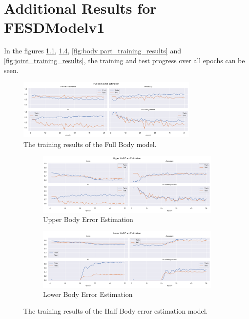 \chapter{Additional Results for FESDModelv1}

In the figures \ref{fig:full_body_training_results_v1}, \ref{fig:half_body_training_results}, \ref{fig:body part_training_results} and \ref{fig:joint_training_results}, the training and test progress over all epochs can be seen.

\begin{figure}[htbp]
  \centering
  \includegraphics[width=0.8\textwidth]{figures/Results/v1/fb/FullBody_ErrorEstimation.png}
  \caption[Full Body model training results]{The training results of the Full Body model.}
  \label{fig:full_body_training_results_v1}
\end{figure}

\begin{figure}[htbp]
  \centering
  \begin{subfigure}[b]{0.8\textwidth}
      \centering
      \includegraphics[width=\textwidth]{figures/Results/v1/hb/UpperBody_ErrorEstimation.png}
      \caption{Upper Body Error Estimation}
      \label{fig:uh_ee}
  \end{subfigure}
  \hfill
  \begin{subfigure}[b]{0.8\textwidth}
      \centering
      \includegraphics[width=\textwidth]{figures/Results/v1/hb/LowerBody_ErrorEstimation.png}
      \caption{Lower Body Error Estimation}
      \label{fig:lh_ee}
  \end{subfigure}
  \caption[Half Body model training results]{The training results of the Half Body error estimation model.}
     \label{fig:half_body_training_results}
\end{figure}

